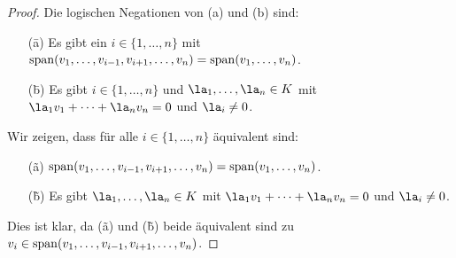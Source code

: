 \documentclass[../../main.tex]{subfiles}
\begin{document}
\begin{proof}
Die logischen Negationen von (a) und (b) sind:
\begin{enumerate}[\normalfont(a)]
\item[(\=a)] Es gibt ein $i\in\{1,\dots,n\}$ mit $\operatorname{span}(v_1,\dots,v_{i-1},v_{i+1},\dots,v_n)=\operatorname{span}(v_1,\dots,v_n)$.
\item[(\=b)] Es gibt $i\in\{1,\dots,n\}$ und $\la_1,\dots,\la_n\in K$ mit $\la_1v_1+\dots+\la_nv_n=0$ und $\la_i\ne0$.
\end{enumerate}
Wir zeigen, dass für alle $i\in\{1,\dots,n\}$ äquivalent sind:
\begin{enumerate}[\normalfont(a)]
\item[(\~a)] $\operatorname{span}(v_1,\dots,v_{i-1},v_{i+1},\dots,v_n)=\operatorname{span}(v_1,\dots,v_n)$.
\item[(\~b)] Es gibt $\la_1,\dots,\la_n\in K$ mit $\la_1v_1+\dots+\la_nv_n=0$ und $\la_i\ne0$.
\end{enumerate}
Dies ist klar, da (\~a) und (\~b) beide äquivalent sind zu $v_i\in\operatorname{span}(v_1,\dots,v_{i-1},v_{i+1},\dots,v_n)$.
\end{proof}
\end{document}
